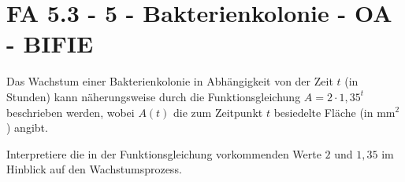 \section{FA 5.3 - 5 - Bakterienkolonie - OA - BIFIE}

\begin{beispiel}[FA 5.3]{1} %
Das Wachstum einer Bakterienkolonie in Abhängigkeit von der Zeit $t$ (in Stunden) kann näherungsweise
durch die Funktionsgleichung $A = 2 \cdot 1,35^t$
 beschrieben werden, wobei $A(t)$ die
zum Zeitpunkt $t$ besiedelte Fläche (in $\text{mm}^2$) angibt. 

\leer

Interpretiere die in der Funktionsgleichung vorkommenden Werte $2$ und $1,35$ im Hinblick auf den Wachstumsprozess.


\end{beispiel}